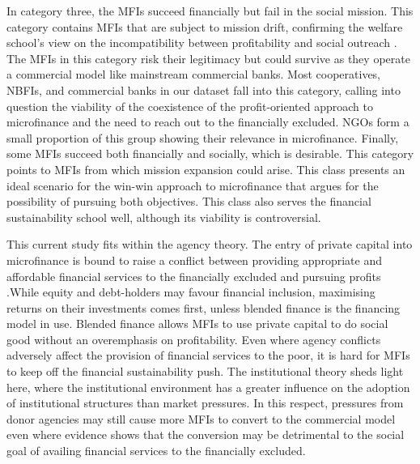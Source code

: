 \documentclass[a4paper, nobind]{templates/ociamthesis}
\begin{document}
In category three, the MFIs succeed financially but fail in the social mission. This category contains MFIs that are subject to mission drift, confirming the welfare school's view on the incompatibility between profitability and social outreach \autocite{mersland2010microfinance,mia2017mission}. The MFIs in this category risk their legitimacy but could survive as they operate a commercial model like mainstream commercial banks. Most cooperatives, NBFIs, and commercial banks in our dataset fall into this category, calling into question the viability of the coexistence of the profit-oriented approach to microfinance and the need to reach out to the financially excluded. NGOs form a small proportion of this group showing their relevance in microfinance. Finally, some MFIs succeed both financially and socially, which is desirable. This category points to MFIs from which mission expansion could arise. This class presents an ideal scenario for the win-win approach to microfinance that argues for the possibility of pursuing both objectives. This class also serves the financial sustainability school well, although its viability is controversial.

This current study fits within the agency theory. The entry of private capital into microfinance is bound to raise a conflict between providing appropriate and affordable financial services to the financially excluded and pursuing profits \autocite{miller2011angel}.While equity and debt-holders may favour financial inclusion, maximising returns on their investments comes first, unless blended finance is the financing model in use. Blended finance allows MFIs to use private capital to do social good without an overemphasis on profitability. Even where agency conflicts adversely affect the provision of financial services to the poor, it is hard for MFIs to keep off the financial sustainability push. The institutional theory sheds light here, where the institutional environment has a greater influence on the adoption of institutional structures than market pressures. In this respect, pressures from donor agencies may still cause more MFIs to convert to the commercial model even where evidence shows that the conversion may be detrimental to the social goal of availing financial services to the financially excluded.
\end{document}

